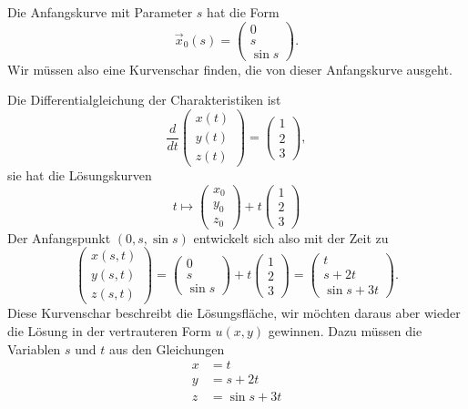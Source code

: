 Die Anfangskurve mit Parameter $s$ hat die Form
\[
\vec x_0(s)
=
\begin{pmatrix}
0\\s\\\sin s
\end{pmatrix}.
\]
Wir müssen also eine Kurvenschar finden, die von dieser Anfangskurve
ausgeht.

Die Differentialgleichung der Charakteristiken ist
\[
\frac{d}{dt}\begin{pmatrix}x(t)\\y(t)\\z(t)\end{pmatrix}
=
\begin{pmatrix}1\\2\\3\end{pmatrix},
\]
sie hat die Lösungskurven
\[
t\mapsto\begin{pmatrix}x_0\\y_0\\z_0\end{pmatrix}+t\begin{pmatrix}1\\2\\3\end{pmatrix}
\]
Der Anfangspunkt $(0,s,\sin s)$ entwickelt sich also mit der Zeit zu
\[
\begin{pmatrix}
x(s,t)\\
y(s,t)\\
z(s,t)
\end{pmatrix}
=
\begin{pmatrix}0\\s\\\sin s\end{pmatrix}+t\begin{pmatrix}1\\2\\3\end{pmatrix}
=
\begin{pmatrix}
t\\
s+2t\\
\sin s+3t
\end{pmatrix}.
\]
Diese Kurvenschar beschreibt die Lösungsfläche, wir möchten daraus aber
wieder die Lösung in der vertrauteren Form $u(x,y)$ gewinnen.
Dazu müssen die Variablen $s$ und $t$ aus den Gleichungen
\begin{align*}
x&=t\\
y&=s+2t\\
z&=\sin s+3t
\end{align*}
